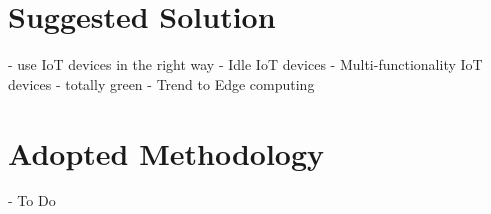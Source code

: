 \section{Suggested Solution}
  - use IoT devices in the right way - Idle IoT devices 
  - Multi-functionality IoT devices
  - totally green
  - Trend to Edge computing

  

\section{Adopted Methodology}
  - To Do

\clearpage